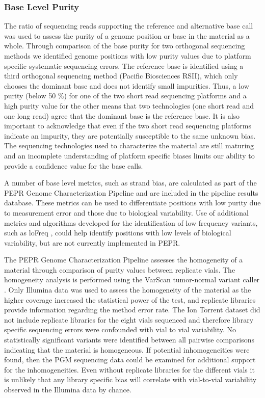 \documentclass[smallextended]{svjour3}\usepackage[]{graphicx}\usepackage[]{color}
\begin{document}
\subsubsection{Base Level Purity}
The ratio of sequencing reads supporting the reference and alternative base call was used to assess the purity of a genome position or base in the material as a whole. Through comparison of the base purity for two orthogonal sequencing methods we identified genome positions with low purity values due to platform specific systematic sequencing errors. The reference base is identified using a third orthogonal sequencing method (Pacific Biosciences RSII), which only chooses the dominant base and does not identify small impurities. Thus, a low purity (below 50 \%) for one of the two short read sequencing platforms and a high purity value for the other means that two technologies (one short read and one long read) agree that the dominant base is the reference base. It is also important to acknowledge that even if the two short read sequencing platforms indicate an impurity, they are potentially susceptible to the same unknown bias. The sequencing technologies used to characterize the material are still maturing and an incomplete understanding of platform specific biases limits our ability to provide a confidence value for the base calls. 

A number of base level metrics, such as strand bias, are calculated as part of the PEPR Genome Characterization Pipeline and are included in the pipeline results database. These metrics can be used to differentiate positions with low purity due to measurement error and those due to biological variability. Use of additional metrics and algorithms developed for the identification of low frequency variants, such as loFreq \cite{Wilm2012}, could help identify positions with low levels of biological variability, but are not currently implemented in PEPR. 

The PEPR Genome Characterization Pipeline assesses the homogeneity of a material through comparison of purity values between replicate vials.  The homogeneity analysis is performed using the VarScan tumor-normal variant caller \cite{Koboldt2009}.  Only Illumina data was used to assess the homogeneity of the material as the higher coverage increased the statistical power of the test, and replicate libraries provide information regarding the method error rate.  The Ion Torrent dataset did not include replicate libraries for the eight vials sequenced and therefore library specific sequencing errors were confounded with vial to vial variability. No statistically significant variants were identified between all pairwise comparisons indicating that the material is homogeneous. If potential inhomogeneities were found, then the PGM sequencing data could be examined for additional support for the inhomogeneities. Even without replicate libraries for the different vials it is unlikely that any library specific bias will correlate with vial-to-vial variability observed in the Illumina data by chance.
\end{document}
